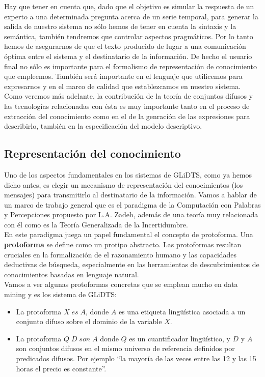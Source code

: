 \documentclass[10pt,a4paper]{article}
\begin{document}
Hay que tener en cuenta que, dado que el objetivo es simular la respuesta de un experto a una determinada pregunta acerca de un serie temporal, para generar la salida de nuestro sistema no sólo hemos de tener en cuenta la sintaxis y la semántica, también tendremos que controlar aspectos pragmáticos. Por lo tanto hemos de asegurarnos de que el texto producido de lugar a una comunicación óptima entre el sistema y el destinatario de la información. De hecho el usuario final no sólo es importante para el formalismo de representación de conocimiento que empleemos. También será importante en el lenguaje que utilicemos para expresarnos y en el marco de calidad que establezcamos en nuestro sistema.\\

Como veremos más adelante, la contribución de la teoría de conjuntos difusos y las tecnologías relacionadas con ésta es muy importante tanto en el proceso de extracción del conocimiento como en el de la genración de las expresiones para describirlo, también en la especificación del modelo descriptivo.

\subsection{Representación del conocimiento}

Uno de los aspectos fundamentales en los sistemas de GLiDTS, como ya hemos dicho antes, es elegir un mecanismo de representación del conocimientos (los mensajes) para transmitirlo al destinatario de la información. Vamos a hablar de un marco de trabajo general que es el paradigma de la Computación con Palabras y Percepciones propuesto por L.A. Zadeh, además de una teoría muy relacionada con él como es la Teoría Generalizada de la Incertidumbre.\\

En este paradigma juega un papel fundamental el concepto de protoforma. Una \textbf{protoforma} se define como un protipo abstracto. Las protoformas resultan cruciales en la formalización de el razonamiento humano y las capacidades deductivas de búsqueda, especialmente en las herramientas de descubrimientos de conocimientos basadas en lenguaje natural.\\

Vamos a ver algunas protoformas concretas que se emplean mucho en data mining y es los sistema de GLiDTS:

\begin{itemize}
\item La protoforma $X \; es \; A$, donde $A$ es una etiqueta lingüística asociada a un conjunto difuso sobre el dominio de la variable $X$.
\item La protoforma $Q \; D \; son \; A$ donde $Q$ es un cuantificador lingüístico, y $D$ y $A$ son conjuntos difusos en el mismo universo de referencia definidos por predicados difusos. Por ejemplo ``la mayoría de las veces entre las 12 y las 15 horas el precio es constante''.
\end{itemize}
\end{document}

